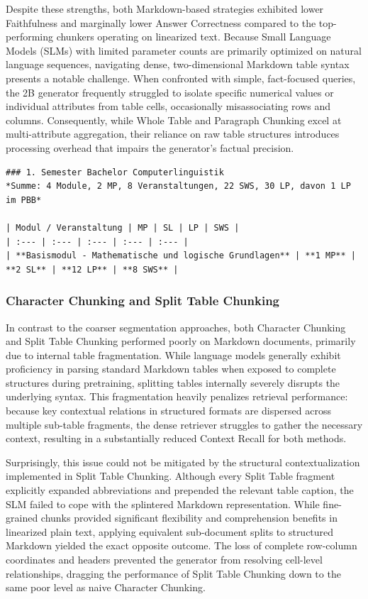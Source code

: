 \documentclass[12pt]{article} %
\begin{document}
Despite these strengths, both Markdown-based strategies exhibited lower Faithfulness and marginally lower Answer Correctness compared to the top-performing chunkers operating on linearized text. Because Small Language Models (SLMs) with limited parameter counts are primarily optimized on natural language sequences, navigating dense, two-dimensional Markdown table syntax presents a notable challenge. When confronted with simple, fact-focused queries, the 2B generator frequently struggled to isolate specific numerical values or individual attributes from table cells, occasionally misassociating rows and columns. Consequently, while Whole Table and Paragraph Chunking excel at multi-attribute aggregation, their reliance on raw table structures introduces processing overhead that impairs the generator's factual precision.
\begin{lstlisting}[basicstyle=\small\ttfamily, frame=single, breaklines=true, caption=Example of Markdown structure in Markdown-converted fPO, label=lst:markdown_example]
### 1. Semester Bachelor Computerlinguistik
*Summe: 4 Module, 2 MP, 8 Veranstaltungen, 22 SWS, 30 LP, davon 1 LP im PBB*

| Modul / Veranstaltung | MP | SL | LP | SWS |
| :--- | :--- | :--- | :--- | :--- |
| **Basismodul - Mathematische und logische Grundlagen** | **1 MP** | **2 SL** | **12 LP** | **8 SWS** |
\end{lstlisting}
\subsubsection{Character Chunking and Split Table Chunking}
In contrast to the coarser segmentation approaches, both Character Chunking and Split Table Chunking performed poorly on Markdown documents, primarily due to internal table fragmentation.
While language models generally exhibit proficiency in parsing standard Markdown tables when exposed to complete structures during pretraining, splitting tables internally severely disrupts the underlying syntax.
This fragmentation heavily penalizes retrieval performance: because key contextual relations in structured formats are dispersed across multiple sub-table fragments, the dense retriever struggles to gather the necessary context, resulting in a substantially reduced Context Recall for both methods.

Surprisingly, this issue could not be mitigated by the structural contextualization implemented in Split Table Chunking. Although every Split Table fragment explicitly expanded abbreviations and prepended the relevant table caption, the SLM failed to cope with the splintered Markdown representation.
While fine-grained chunks provided significant flexibility and comprehension benefits in linearized plain text, applying equivalent sub-document splits to structured Markdown yielded the exact opposite outcome. The loss of complete row-column coordinates and headers prevented the generator from resolving cell-level relationships, dragging the performance of Split Table Chunking down to the same poor level as naive Character Chunking.
\end{document}
